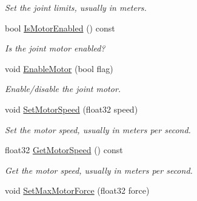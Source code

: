 \begin{DoxyCompactItemize}
\begin{DoxyCompactList}\small\item\em Set the joint limits, usually in meters. \end{DoxyCompactList}\item 
\hypertarget{classb2_prismatic_joint_a236650664554a4d81f8644e9a9d19c65}{bool \hyperlink{classb2_prismatic_joint_a236650664554a4d81f8644e9a9d19c65}{Is\-Motor\-Enabled} () const }\label{classb2_prismatic_joint_a236650664554a4d81f8644e9a9d19c65}

\begin{DoxyCompactList}\small\item\em Is the joint motor enabled? \end{DoxyCompactList}\item 
\hypertarget{classb2_prismatic_joint_a4a7fd079de49f7ed5aa4a5d8d90be2a2}{void \hyperlink{classb2_prismatic_joint_a4a7fd079de49f7ed5aa4a5d8d90be2a2}{Enable\-Motor} (bool flag)}\label{classb2_prismatic_joint_a4a7fd079de49f7ed5aa4a5d8d90be2a2}

\begin{DoxyCompactList}\small\item\em Enable/disable the joint motor. \end{DoxyCompactList}\item 
\hypertarget{classb2_prismatic_joint_a602ef7a6ca4fca55d011f1b38ab5a6c3}{void \hyperlink{classb2_prismatic_joint_a602ef7a6ca4fca55d011f1b38ab5a6c3}{Set\-Motor\-Speed} (float32 speed)}\label{classb2_prismatic_joint_a602ef7a6ca4fca55d011f1b38ab5a6c3}

\begin{DoxyCompactList}\small\item\em Set the motor speed, usually in meters per second. \end{DoxyCompactList}\item 
\hypertarget{classb2_prismatic_joint_a20f969fefb08d86728bd1f0cf03e121f}{float32 \hyperlink{classb2_prismatic_joint_a20f969fefb08d86728bd1f0cf03e121f}{Get\-Motor\-Speed} () const }\label{classb2_prismatic_joint_a20f969fefb08d86728bd1f0cf03e121f}

\begin{DoxyCompactList}\small\item\em Get the motor speed, usually in meters per second. \end{DoxyCompactList}\item 
\hypertarget{classb2_prismatic_joint_aa7817474aef15ca4815341479ac590e2}{void \hyperlink{classb2_prismatic_joint_aa7817474aef15ca4815341479ac590e2}{Set\-Max\-Motor\-Force} (float32 force)}\label{classb2_prismatic_joint_aa7817474aef15ca4815341479ac590e2}


\end{DoxyCompactItemize}
